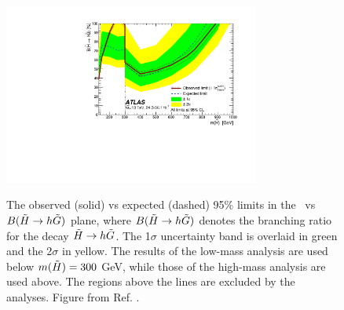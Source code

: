 \begin{figure}[htbp]    
	\centering    
    \includegraphics[width=0.75\textwidth]{figures/ewk_prod/interpretation/my_br_plot_unblind_yellow_band}\label{fig:exclusion_br}
	\caption{The observed (solid) vs expected (dashed) 95\% limits in the \mhino\ vs $B(\tilde{H}\rightarrow h \tilde{G})$ plane, where $B(\tilde{H}\rightarrow h \tilde{G})$ denotes the branching ratio for the decay $\tilde{H} \rightarrow h \tilde{G}$. The 1$\sigma$ uncertainty band is overlaid in green and the 2$\sigma$ in yellow.
	The results of the low-mass analysis are used below $m(\tilde{H}) = 300$ GeV, while those of the high-mass analysis are used above.
	 The regions above the lines are excluded by the analyses. Figure from Ref. \cite{Aaboud:2018htj}. } 
	\label{fig:ewk:exclusion_combBR}
\end{figure}


